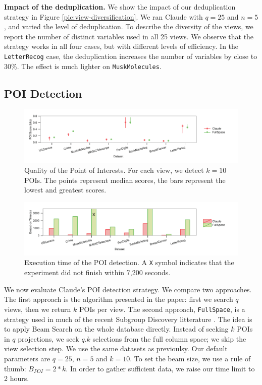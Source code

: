 \textbf{Impact of the deduplication.} We show the impact of our deduplication
strategy in Figure \ref{pic:view-diversification}.  We ran Claude with $q=25$
and $n=5$, and varied the level of deduplication. To describe the diversity of
the views, we report the number of distinct variables used in all 25 views. We
observe that the strategy works in all four cases, but with different levels of
efficiency. In the \texttt{LetterRecog} case, the deduplication increases the
number of variables by close to 30\%. The effect is much lighter on
\texttt{MuskMolecules}.


\subsection{POI Detection}
\label{sec:exp-poi}

\begin{figure}[t!]
\centering
\includegraphics[width=2\columnwidth]{plots/POI-score}
\caption{Quality of the Point of Interests. For each view, we detect $k=10$
POIs. The
    points represent median scores, the bars represent the lowest and greatest
    scores.}
\label{pic:POI-quali}
\end{figure}
\begin{figure}[t!]
\centering
\includegraphics[width=2\columnwidth]{plots/POI-timing}
\caption{Execution time of the POI detection. A \texttt{X} symbol
indicates that the experiment did not finish within 7,200 seconds.}
\label{pic:POI-time}
\end{figure}

We now evaluate Claude's POI detection strategy. We compare two approaches. The
first approach is the algorithm presented in the paper: first we search $q$
views, then we return $k$ POIs per view. The second approach,
\texttt{FullSpace}, is a strategy used in much of the recent Subgroup Discovery
litterature \cite{van2011non, duivesteijn2010subgroup}.  The idea is to apply
Beam Search on the whole database directly. Instead of seeking $k$ POIs in $q$
projections, we seek $q.k$ selections from the full column space; we skip the
view selection step. We use the same datasets as previoulsy. Our default
parameters are $q=25$, $n=5$ and $k=10$. To set the beam size, we use a rule of
thumb: $B_{POI} = 2 * k$. In order to gather sufficient data, we raise our time
limit to 2 hours. 

